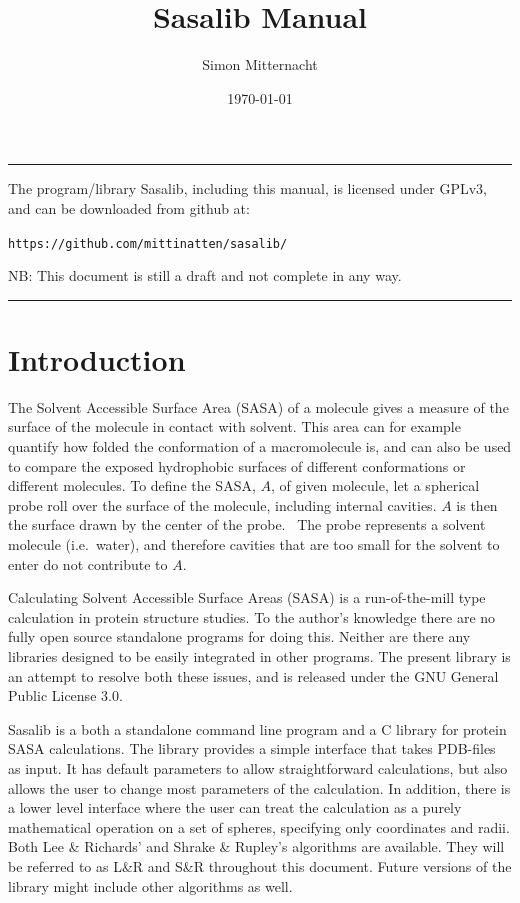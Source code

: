 \documentclass[a4paper,11pt]{article}
\author{Simon Mitternacht}
\date{\today}
\title{Sasalib Manual}
\begin{document}
\maketitle
\hrule\vspace{0.5cm}
\noindent
The program/library Sasalib, including this manual, is licensed under
GPLv3, and can be downloaded from github at: 
\begin{center}
\texttt{https://github.com/mittinatten/sasalib/}
\end{center}
NB: This document is still a draft and not complete in any way.
\vspace{0.5cm}
\hrule
\section{Introduction}
The Solvent Accessible Surface Area (SASA) of a molecule gives a
measure of the surface of the molecule in contact with solvent. This
area can for example quantify how folded the conformation of a
macromolecule is, and can also be used to compare the exposed
hydrophobic surfaces of different conformations or different
molecules. To define the SASA, $A$, of given molecule, let a spherical
probe roll over the surface of the molecule, including internal
cavities. $A$ is then the surface drawn by the center of the
probe.~\cite{LnR} The probe represents a solvent molecule
(i.e.\ water), and therefore cavities that are too small for the
solvent to enter do not contribute to $A$.

Calculating Solvent Accessible Surface Areas (SASA) is a
run-of-the-mill type calculation in protein structure studies. To the
author's knowledge there are no fully open source standalone programs
for doing this. Neither are there any libraries designed to be easily
integrated in other programs. The present library is an attempt to
resolve both these issues, and is released under the GNU General
Public License 3.0.

Sasalib is a both a standalone command line program and a C library
for protein SASA calculations. The library provides a simple interface
that takes PDB-files as input. It has default parameters to allow
straightforward calculations, but also allows the user to change most
parameters of the calculation. In addition, there is a lower level
interface where the user can treat the calculation as a purely
mathematical operation on a set of spheres, specifying only
coordinates and radii. Both Lee \& Richards' \cite{LnR} and Shrake \&
Rupley's \cite{SnR} algorithms are available. They will be referred to
as L\&R and S\&R throughout this document. Future versions of the
library might include other algorithms as well.
\end{document}

